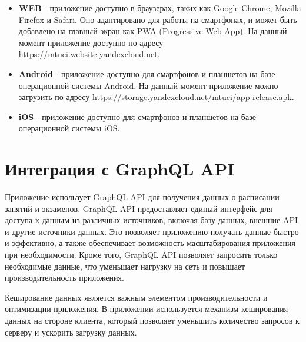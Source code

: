 \begin{itemize}
    \item \textbf{WEB} - приложение доступно в браузерах, таких как Google Chrome, Mozilla Firefox и Safari. 
    Оно адаптировано для работы на смартфонах, и может быть добавлено на главный экран как PWA (Progressive Web App).
    На данный момент приложение доступно по адресу \url{https://mtuci.website.yandexcloud.net}.
    \item \textbf{Android} - приложение доступно для смартфонов и планшетов на базе операционной системы Android.
    На данный момент приложение можно загрузить по адресу \url{https://storage.yandexcloud.net/mtuci/app-release.apk}.
    \item \textbf{iOS} - приложение доступно для смартфонов и планшетов на базе операционной системы iOS.
\end{itemize}

\section{Интеграция с GraphQL API}
Приложение использует GraphQL API для получения данных о расписании занятий и экзаменов. 
GraphQL API предоставляет единый интерфейс для доступа к данным из различных источников, 
включая базу данных, внешние API и другие источники данных. 
Это позволяет приложению получать данные быстро и эффективно, 
а также обеспечивает возможность масштабирования приложения при необходимости. 
Кроме того, GraphQL API позволяет запросить только необходимые данные, 
что уменьшает нагрузку на сеть и повышает производительность приложения.

Кеширование данных является важным элементом производительности и оптимизации приложения. 
В приложении используется механизм кеширования данных на стороне клиента, 
который позволяет уменьшить количество запросов к серверу и ускорить загрузку данных.
